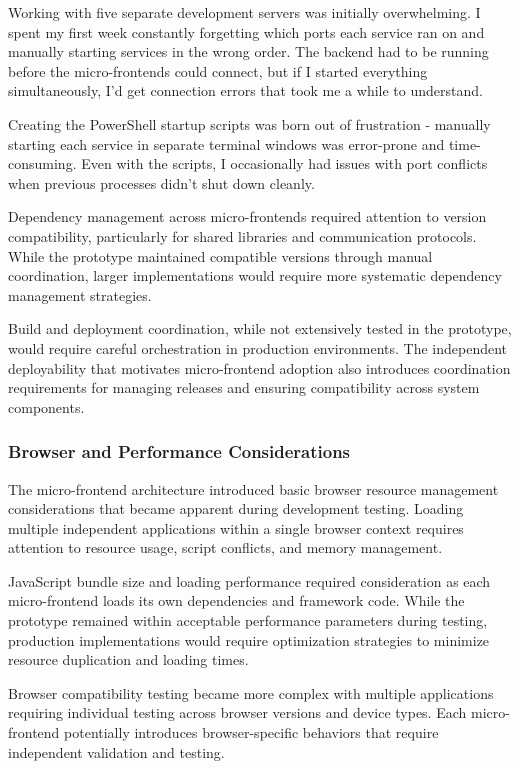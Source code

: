 \documentclass[12pt,a4paper]{report}
\begin{document}
Working with five separate development servers was initially overwhelming. I spent my first week constantly forgetting which ports each service ran on and manually starting services in the wrong order. The backend had to be running before the micro-frontends could connect, but if I started everything simultaneously, I'd get connection errors that took me a while to understand.

Creating the PowerShell startup scripts was born out of frustration - manually starting each service in separate terminal windows was error-prone and time-consuming. Even with the scripts, I occasionally had issues with port conflicts when previous processes didn't shut down cleanly.

Dependency management across micro-frontends required attention to version compatibility, particularly for shared libraries and communication protocols. While the prototype maintained compatible versions through manual coordination, larger implementations would require more systematic dependency management strategies.

Build and deployment coordination, while not extensively tested in the prototype, would require careful orchestration in production environments. The independent deployability that motivates micro-frontend adoption also introduces coordination requirements for managing releases and ensuring compatibility across system components.

\subsubsection{Browser and Performance Considerations}

The micro-frontend architecture introduced basic browser resource management considerations that became apparent during development testing. Loading multiple independent applications within a single browser context requires attention to resource usage, script conflicts, and memory management.

JavaScript bundle size and loading performance required consideration as each micro-frontend loads its own dependencies and framework code. While the prototype remained within acceptable performance parameters during testing, production implementations would require optimization strategies to minimize resource duplication and loading times.

Browser compatibility testing became more complex with multiple applications requiring individual testing across browser versions and device types. Each micro-frontend potentially introduces browser-specific behaviors that require independent validation and testing.
\end{document}
